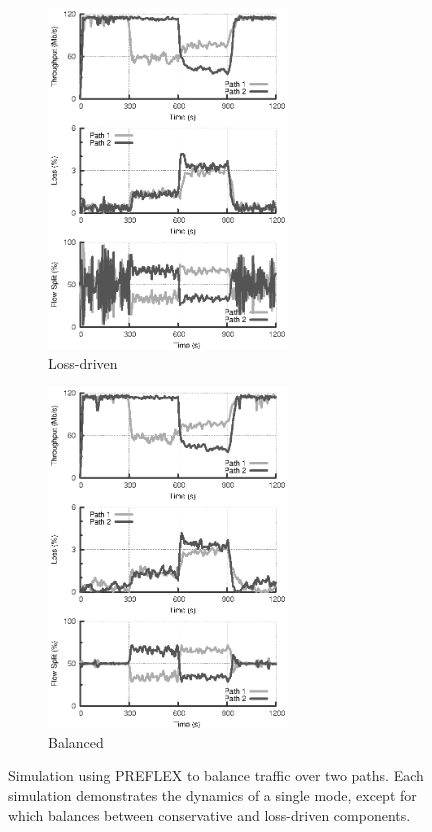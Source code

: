 \begin{figure}
    \begin{subfigure}[b]{.5\linewidth}
        \centering
        \includegraphics[width=2.5in]{figures/cate/two/loss}
        \caption{Loss-driven}\label{fig:twoloss}
    \end{subfigure}%
    \begin{subfigure}[b]{.5\linewidth}
        \centering
        \includegraphics[width=2.5in]{figures/cate/two/correct}
        \caption{Balanced}\label{fig:twopreflex}
    \end{subfigure}%

    \caption{Simulation using PREFLEX to balance traffic over two paths.
        \label{fig:two}
        Each simulation demonstrates the dynamics of a single mode, except for
         which balances between conservative and loss-driven components.  }
\end{figure}


